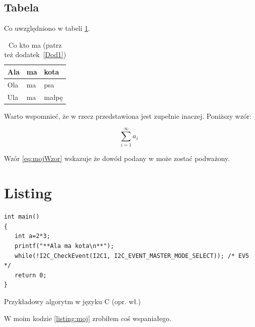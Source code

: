 \subsection{Tabela}

Co uwzględniono w tabeli \ref{tabela:coktoma}. \lipsum[13-15] 

\begin{table}
\centering\caption{Co kto ma \cite{harel_rzecz_2008} (patrz też dodatek~\ref{Dod1}) \label{tabela:coktoma}}
\begin{tabular}{|l|l|l|}%
\hline
Ala & ma & kota \\
\hline
Ola & ma & psa \\
\hline
Ula & ma & małpę\\
\hline
\end{tabular}
\end{table}

\lipsum[19-20] Warto wspomnieć, że w \cite{aizawa_groundwater_2009} rzecz przedstawiona jest zupełnie inaczej. Poniższy wzór:

\begin{equation}
\sum_{i=1}^{\infty}a_i
\label{eq:mojWzor}
\end{equation}

Wzór \ref{eq:mojWzor} wskazuje że dowód podany w \cite{kaleta_experimental_2005} może zostać podważony. \lipsum[9]

\section{Listing}

\begin{listing}
\begin{verbatim} 
int main()
{
   int a=2*3;
   printf("**Ala ma kota\n**");
   while(!I2C_CheckEvent(I2C1, I2C_EVENT_MASTER_MODE_SELECT)); /* EV5 */
   return 0;
}
\end{verbatim}
\caption{Przykładowy algorytm w języku C (opr. wł.)} \label{listing:moj}
\end{listing}

W moim kodzie \ref{listing:moj} zrobiłem coś wspaniałego. \lipsum[4]